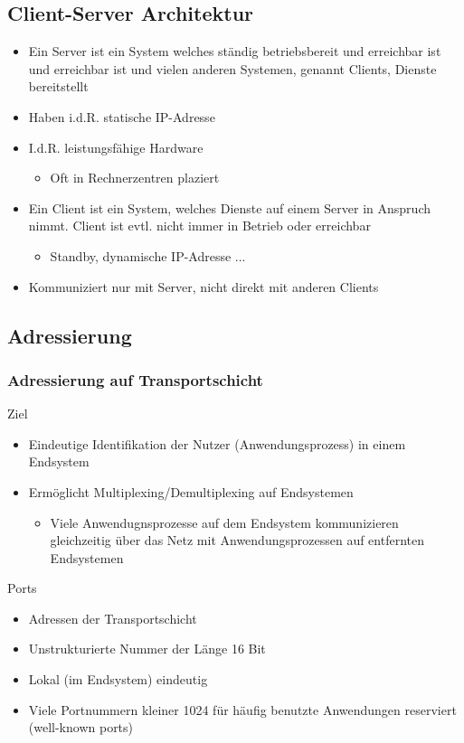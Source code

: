   \subsection{Client-Server Architektur}
    \begin{itemize}
      \item Ein Server ist ein System welches ständig betriebsbereit und erreichbar ist und erreichbar ist
        und vielen anderen Systemen, genannt Clients, Dienste bereitstellt
      \item Haben i.d.R. statische IP-Adresse
      \item I.d.R. leistungsfähige Hardware
        \begin{itemize}
          \item Oft in Rechnerzentren plaziert
        \end{itemize}
      \item Ein Client ist ein System, welches Dienste auf einem Server in Anspruch nimmt. Client ist
        evtl. nicht immer in Betrieb oder erreichbar
        \begin{itemize}
          \item Standby, dynamische IP-Adresse ...
        \end{itemize}
      \item Kommuniziert nur mit Server, nicht direkt mit anderen Clients
    \end{itemize}
  \subsection{Adressierung}
    \subsubsection{Adressierung auf Transportschicht}
      Ziel
      \begin{itemize}
        \item Eindeutige Identifikation der Nutzer (Anwendungsprozess) in einem Endsystem
        \item Ermöglicht Multiplexing/Demultiplexing auf Endsystemen
          \begin{itemize}
            \item Viele Anwendugnsprozesse auf dem Endsystem kommunizieren gleichzeitig über das Netz
              mit Anwendungsprozessen auf entfernten Endsystemen
          \end{itemize}
      \end{itemize}
      Ports
      \begin{itemize}
        \item Adressen der Transportschicht
        \item Unstrukturierte Nummer der Länge 16 Bit
        \item Lokal (im Endsystem) eindeutig
        \item Viele Portnummern kleiner 1024 für häufig benutzte Anwendungen reserviert (well-known
          ports)
      \end{itemize}
